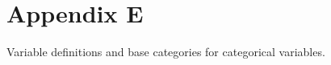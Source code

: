 \documentclass[class=article, crop=false]{standalone}
\begin{document}
\section{Appendix E}
\label{sec:appendixE}
Variable definitions and base categories for categorical variables.

\ifstandalone

\fi
\end{document}
